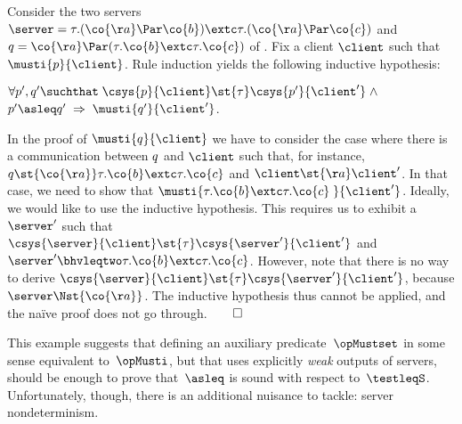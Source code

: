 \begin{example}
  \label{ex:must-set-is-helpful}
  Consider the two servers $\server = \tau.(\co{\aa} \Par \co{b}) \extc
  \tau.(\co{\aa} \Par \co{c})$ and $\serverB = \co{\aa} \Par (\tau.\co{b} \extc
  \tau.\co{c})$ of .
  Fix a client $\client$ such that $\musti{\serverA}{\client}$.
  Rule induction %
  yields the following inductive hypothesis:
  \begin{center}
    $\forall \serverA', \serverB' \suchthat\;
    \csys{\serverA}{\client} \st{\tau} \csys{\serverA'}{\client'} \;\land\;$
    $\serverA' \asleq \serverB' \;\Rightarrow\; \musti{\serverB'}{\client'}$.
  \end{center}
  In the proof of
  $\musti{\serverB}{\client}$ we have to consider the case where there
  is a communication between $q$ and
  $\client$ such that, for instance, $\serverB \st{\co{\aa}}
  \tau.\co{b} \extc \tau.\co{c}$ and $\client \st{\aa}
  \client'$.  In that case, we need to show that $\musti{\tau.\co{b}
    \extc \tau.\co{c}\;}{\client'}$. Ideally, we would like to use the inductive
  hypothesis. This requires us to exhibit a $\server'$ such that $
  \csys{\server}{\client} \st{\tau} \csys{\server'}{\client'}$ and $
  \server' \bhvleqtwo \tau.\co{b} \extc \tau.\co{c}$.
  However, note that there is no way to derive
  $\csys{\server}{\client} \st{\tau} \csys{\server'}{\client'}
  $, because $\server
  \Nst{\co{\aa}}$.  The inductive hypothesis thus cannot be applied,
  and the naïve proof does not go through.\hfill$\qed$
\end{example}
\noindent
This example suggests that defining an auxiliary predicate~$\opMustset$ in some sense
equivalent to~$\opMusti$, but that uses explicitly {\em weak} outputs
of servers, should be enough to prove that~$\asleq$ is sound with respect to~$\testleqS$.
Unfortunately, though, there is an additional nuisance to tackle: server
nondeterminism.
